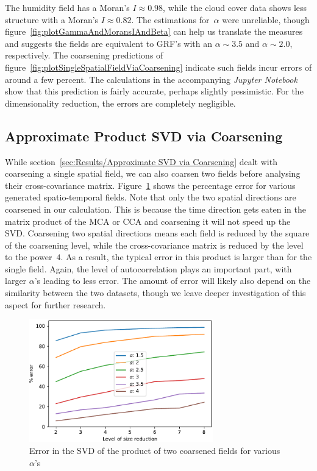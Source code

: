 \documentclass[ijgi,article,submit,moreauthors,pdftex,10pt,a4paper]{Definitions/mdpi}
\begin{document}
The humidity field has a Moran's $I \approx 0.98$, while the cloud cover data shows less structure with a Moran's $I \approx 0.82$. The estimations for~$\alpha$ were unreliable, though figure~\ref{fig:plotGammaAndMoransIAndBeta} can help us translate the measures and suggests the fields are equivalent to GRF's with an $\alpha \sim 3.5$ and $\alpha \sim 2.0$, respectively. The coarsening predictions of figure~\ref{fig:plotSingleSpatialFieldViaCoarsening} indicate such fields incur errors of around a few percent. The calculations in the accompanying \textit{Jupyter Notebook} show that this prediction is fairly accurate, perhaps slightly pessimistic. For the dimensionality reduction, the errors are completely negligible.

\subsection{Approximate Product SVD via Coarsening}
\label{sec:Results/Approximate Product SVD via Coarsening}

While section~\ref{sec:Results/Approximate SVD via Coarsening} dealt with coarsening a single spatial field, we can also coarsen two fields before analysing their cross-covariance matrix. Figure~\ref{fig:plotProductSpatialTemporalFieldsViaCoarsening} shows the percentage error for various generated spatio-temporal fields. Note that only the two spatial directions are coarsened in our calculation. This is because the time direction gets eaten in the matrix product of the MCA or CCA and coarsening it will not speed up the SVD. Coarsening two spatial directions means each field is reduced by the square of the coarsening level, while the cross-covariance matrix is reduced by the level to the power~$4$. As a result, the typical error in this product is larger than for the single field. Again, the level of autocorrelation plays an important part, with larger $\alpha$'s leading to less error. The amount of error will likely also depend on the similarity between the two datasets, though we leave deeper investigation of this aspect for further research. 

\begin{figure}[H]
\centering
\includegraphics[width=80mm]{Results/plotProductSpatialTemporalFieldsViaCoarsening.pdf}
\caption[Error after coarsening]{Error in the SVD of the product of two coarsened fields for various $\alpha$'s}
\label{fig:plotProductSpatialTemporalFieldsViaCoarsening}
\end{figure}
\end{document}
